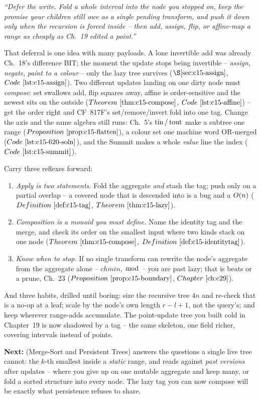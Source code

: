\begin{lastword}
\emph{``Defer the write. Fold a whole interval into the node you stopped on, keep the
promise your children still owe as a single pending transform, and push it down only when
the recursion is forced inside -- then add, assign, flip, or affine-map a range as cheaply
as Ch.~19 edited a point.''}

\medskip
That deferral is one idea with many payloads. A lone invertible add was already Ch.~18's
difference BIT; the moment the update stops being invertible -- \emph{assign}, \emph{negate},
\emph{paint to a colour} -- only the lazy tree survives (\(\secref{c15-assign}\),
\(\coderef{c15-assign}\)). Two different updates landing on one dirty node must
\emph{compose}: set swallows add, flip squares away, affine is order-sensitive and the newest
sits on the outside (\(\thmref{c15-compose}\), \(\coderef{c15-affine}\)) -- get the order right
and CF~817F's set/remove/invert fold into one tag. Change the axis and the same algebra still
runs: Ch.~5's \(\operatorname{tin}/\operatorname{tout}\) make a subtree one range (\(\propref{c15-flatten}\)), a colour set
one machine word OR-merged (\(\coderef{c15-620-soln}\)), and the Summit makes a whole
\emph{value} line the index (\(\coderef{c15-summit}\)).

\medskip
Carry three reflexes forward:
\begin{enumerate}[nosep, leftmargin=1.6em]
  \item \emph{Apply is two statements.} Fold the aggregate \emph{and} stash the tag; push
        only on a partial overlap -- a covered node that is descended into is a bug and a
        \(O(n)\) (\(\defref{c15-tag}\), \(\thmref{c15-lazy}\)).
  \item \emph{Composition is a monoid you must define.} Name the identity tag and the merge,
        and check its order on the smallest input where two kinds stack on one node
        (\(\thmref{c15-compose}\), \(\defref{c15-identitytag}\)).
  \item \emph{Know when to stop.} If no single transform can rewrite the node's aggregate
        from the aggregate alone -- \(\mathit{chmin}\), \(\bmod\) -- you are past lazy; that is
        beats or a prune, Ch.~23 (\(\propref{c15-boundary}\), \(\chref{c29}\)).
\end{enumerate}

\medskip
And three habits, drilled until boring: size the recursive tree \(4n\) and re-check that
 is a no-op at a leaf; scale  by the node's own length
\(r-l+1\), not the query's; and keep  wherever range-adds accumulate. The
point-update tree you built cold in Chapter~19 is now shadowed by a tag -- the same skeleton,
one field richer, covering intervals instead of points.

\medskip
\textbf{Next:}  (Merge-Sort and Persistent Trees) answers the questions a single
live tree cannot: the \(k\)-th smallest inside a \emph{static} range, and reads against
\emph{past versions} after updates -- where you give up on one mutable aggregate and keep many,
or fold a sorted structure into every node. The lazy tag you can now compose will be exactly
what persistence refuses to share.
\end{lastword}
